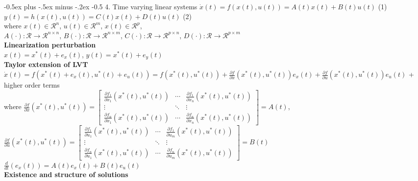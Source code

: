 \documentclass[10pt,landscape]{article}
\makeatletter
\renewcommand{\section}{\@startsection{section}{1}{0mm}%
                                {-0.5ex plus -.5ex minus -.2ex}%
                                {-0.5\baselineskip}%
                                {\normalfont\small\bfseries}}
\makeatother
\begin{document}
\begin{multicols*}{4}
\section{4. Time varying linear systems}
$\dot{x}(t) = f(x(t), u(t)) = A(t)x(t) + B(t)u(t)$ \qquad (1)\\
$y(t) = h(x(t), u(t)) = C(t)x(t) + D(t)u(t)$ \qquad (2)\\
where $x(t) \in \mathcal{R}^n$, $u(t) \in \mathcal{R}^m$, $x(t) \in \mathcal{R}^p$, \\
$A(\cdot):  \mathcal{R} \rightarrow \mathcal{R}^{n \times n}$, $B(\cdot):  \mathcal{R} \rightarrow \mathcal{R}^{n \times m}$, $C(\cdot):  \mathcal{R} \rightarrow \mathcal{R}^{p \times n}$, $D(\cdot):  \mathcal{R} \rightarrow \mathcal{R}^{p \times m}$ \\
\textbf{Linearization perturbation}\\
$x(t) = x^*(t) + e_x(t)$, $y(t) = x^*(t) + e_y(t)$\\
\textbf{Taylor extension of LVT}
$\dot{x}(t) = f(x^*(t)+e_x(t), u^*(t)+e_u(t))=f(x^*(t), u^*(t))+\frac{\partial{f}}{\partial{x}}(x^*(t), u^*(t))e_x(t)+\frac{\partial f}{\partial u}(x^*(t), u^*(t))e_u(t)$  + higher order terms\\
where 
$
\frac{\partial{f}}{\partial{x}}(x^*(t), u^*(t)) = \left[ \begin{array}{ccc} \frac{\partial{f_1}}{\partial{x_1}}(x^*(t), u^*(t)) & \cdots & \frac{\partial{f_1}}{\partial{x_n}}(x^*(t), u^*(t))\\
\vdots & \ddots & \vdots \\
\frac{\partial{f_n}}{\partial{x_1}}(x^*(t), u^*(t)) & \cdots & \frac{\partial{f_n}}{\partial{x_n}}(x^*(t), u^*(t))
\end{array} \right] = A(t)
$,\\
$
\frac{\partial{f}}{\partial{u}}(x^*(t), u^*(t)) = \left[ \begin{array}{ccc} \frac{\partial{f_1}}{\partial{u_1}}(x^*(t), u^*(t)) & \cdots & \frac{\partial{f_1}}{\partial{u_m}}(x^*(t), u^*(t))\\
\vdots & \ddots & \vdots \\
\frac{\partial{f_n}}{\partial{u_1}}(x^*(t), u^*(t)) & \cdots & \frac{\partial{f_n}}{\partial{u_m}}(x^*(t), u^*(t))
\end{array} \right] = B(t)
$\\
$\frac{d}{dt}(e_x(t))=A(t)e_x(t)+B(t)e_u(t)$\\
\textbf{Existence and structure of solutions}
\begin{tabular}{|c|c|c|c|}

\end{tabular}
\end{multicols*}
\end{document}
